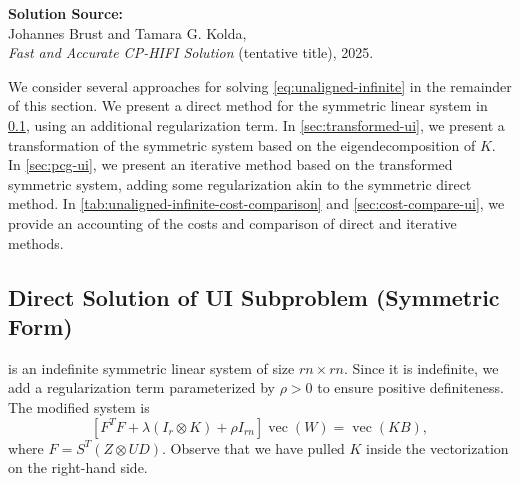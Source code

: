 \documentclass{article}
\DeclareMathOperator{\vecop}{vec}
\theoremstyle{plain} %
\begin{document}
\begin{center}
	\large
	\textbf{Solution Source:} \\
	Johannes Brust and Tamara G. Kolda,\\
	\emph{Fast and Accurate CP-HIFI Solution} (tentative title), 2025.
\end{center}

We consider several approaches for solving \cref{eq:unaligned-infinite} 
in the remainder of this section.
We present a direct method for the symmetric linear system in \cref{sec:direct-ui-sym},
using an additional regularization term.
In \cref{sec:transformed-ui}, we present a transformation of the symmetric system
based on the eigendecomposition of $K$.
In \cref{sec:pcg-ui}, we present an iterative method based on
the transformed symmetric system, adding some regularization akin to the symmetric direct method.
In \cref{tab:unaligned-infinite-cost-comparison} and \cref{sec:cost-compare-ui},
we provide an accounting of the costs and comparison of direct and iterative methods.

\subsection{Direct Solution of UI Subproblem (Symmetric Form)}
\label{sec:direct-ui-sym}

 is an indefinite 
symmetric linear system of size $rn \times rn$.
Since it is indefinite, 
we add a regularization term parameterized by $\rho > 0$ 
to ensure positive definiteness.
The modified system is
\begin{equation}\label{eq:unaligned-infinite-1}
	[ F^T F  + \lambda (I_r \otimes K) + \rho  I_{rn} ] \vecop(W)
	= \vecop(K B),
\end{equation}
where $F=S^T(Z \otimes UD)$.
Observe that we have pulled $K$ inside the vectorization on the right-hand side.
	
\end{document}
